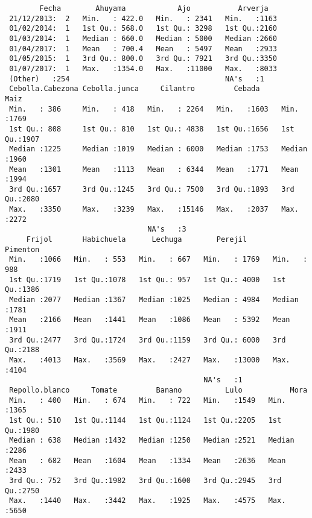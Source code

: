 \documentclass[11pt]{article}
\begin{document}
    
    \begin{verbatim}
        Fecha        Ahuyama            Ajo           Arverja    
 21/12/2013:  2   Min.   : 422.0   Min.   : 2341   Min.   :1163  
 01/02/2014:  1   1st Qu.: 568.0   1st Qu.: 3298   1st Qu.:2160  
 01/03/2014:  1   Median : 660.0   Median : 5000   Median :2660  
 01/04/2017:  1   Mean   : 700.4   Mean   : 5497   Mean   :2933  
 01/05/2015:  1   3rd Qu.: 800.0   3rd Qu.: 7921   3rd Qu.:3350  
 01/07/2017:  1   Max.   :1354.0   Max.   :11000   Max.   :8033  
 (Other)   :254                                    NA's   :1     
 Cebolla.Cabezona Cebolla.junca     Cilantro         Cebada          Maiz     
 Min.   : 386     Min.   : 418   Min.   : 2264   Min.   :1603   Min.   :1769  
 1st Qu.: 808     1st Qu.: 810   1st Qu.: 4838   1st Qu.:1656   1st Qu.:1907  
 Median :1225     Median :1019   Median : 6000   Median :1753   Median :1960  
 Mean   :1301     Mean   :1113   Mean   : 6344   Mean   :1771   Mean   :1994  
 3rd Qu.:1657     3rd Qu.:1245   3rd Qu.: 7500   3rd Qu.:1893   3rd Qu.:2080  
 Max.   :3350     Max.   :3239   Max.   :15146   Max.   :2037   Max.   :2272  
                                 NA's   :3                                    
     Frijol       Habichuela      Lechuga        Perejil         Pimenton   
 Min.   :1066   Min.   : 553   Min.   : 667   Min.   : 1769   Min.   : 988  
 1st Qu.:1719   1st Qu.:1078   1st Qu.: 957   1st Qu.: 4000   1st Qu.:1386  
 Median :2077   Median :1367   Median :1025   Median : 4984   Median :1781  
 Mean   :2166   Mean   :1441   Mean   :1086   Mean   : 5392   Mean   :1911  
 3rd Qu.:2477   3rd Qu.:1724   3rd Qu.:1159   3rd Qu.: 6000   3rd Qu.:2188  
 Max.   :4013   Max.   :3569   Max.   :2427   Max.   :13000   Max.   :4104  
                                              NA's   :1                     
 Repollo.blanco     Tomate         Banano          Lulo           Mora     
 Min.   : 400   Min.   : 674   Min.   : 722   Min.   :1549   Min.   :1365  
 1st Qu.: 510   1st Qu.:1144   1st Qu.:1124   1st Qu.:2205   1st Qu.:1980  
 Median : 638   Median :1432   Median :1250   Median :2521   Median :2286  
 Mean   : 682   Mean   :1604   Mean   :1334   Mean   :2636   Mean   :2433  
 3rd Qu.: 752   3rd Qu.:1982   3rd Qu.:1600   3rd Qu.:2945   3rd Qu.:2750  
 Max.   :1440   Max.   :3442   Max.   :1925   Max.   :4575   Max.   :5650  
                                                                           

\end{verbatim}
\end{document}
